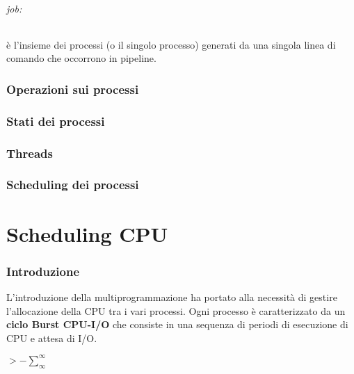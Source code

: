 \documentclass{article}
\begin{document}
\paragraph{job:} è l'insieme dei processi (o il singolo processo) generati da una singola linea di comando che occorrono in pipeline.
\section{Operazioni sui processi}
\section{Stati dei processi}
\section{Threads}
\section{Scheduling dei processi}







\part{Scheduling CPU} %
\section{Introduzione}
L'introduzione della multiprogrammazione ha portato alla necessità di gestire l'allocazione della CPU tra i vari processi.
Ogni processo è caratterizzato da un \textbf{ciclo Burst CPU-I/O} che consiste in una sequenza di periodi
di esecuzione di CPU e attesa di I/O.


$\displaystyle > - \sum_{\infty}^{\infty}  $
\end{document}
